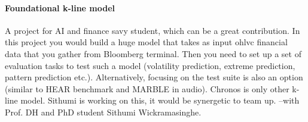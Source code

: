 \documentclass[DIV12, oneside]{scrartcl}
\begin{document}
\paragraph{Foundational k-line model} 
A project for AI and finance savy student, which can be a great contribution. In this project you would build a huge model that takes as input ohlvc financial data that you gather from Bloomberg terminal. Then you need to set up a set of evaluation tasks to test such a model (volatility prediction, extreme prediction, pattern prediction etc.). Alternatively, focusing on the test suite is also an option (similar to HEAR benchmark and MARBLE in audio). Chronos is only other k-line model. Sithumi is working on this, it would be synergetic to team up. --with Prof. DH and PhD student Sithumi Wickramasinghe. 







\end{document}
